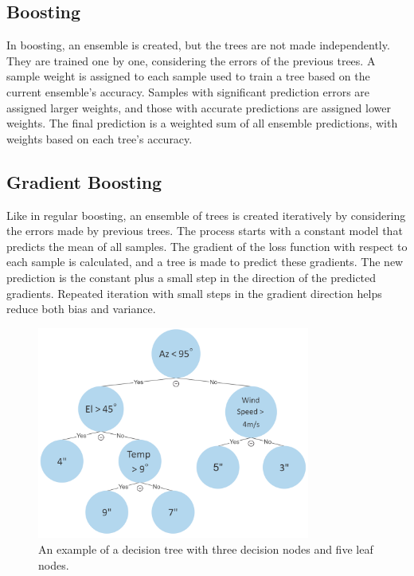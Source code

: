 \subsection{Boosting}
In boosting, an ensemble is created, but the trees are not made independently.
They are trained one by one, considering the errors of the previous trees.
A sample weight is assigned to each sample used to train a tree based on the current ensemble's accuracy.
Samples with significant prediction errors are assigned larger weights, and those with accurate predictions are assigned lower weights.
The final prediction is a weighted sum of all ensemble predictions, with weights based on each tree's accuracy.

\subsection{Gradient Boosting}
Like in regular boosting, an ensemble of trees is created iteratively by considering the errors made by previous trees.
The process starts with a constant model that predicts the mean of all samples.
The gradient of the loss function with respect to each sample is calculated, and a tree is made to predict these gradients.
The new prediction is the constant plus a small step in the direction of the predicted gradients.
Repeated iteration with small steps in the gradient direction helps reduce both bias and variance.




\begin{figure}[H]
    \centering
    \includegraphics[width=0.8\textwidth]{Other figures/decisiontree_example.PNG}
    \caption[Decision tree]{An example of a decision tree with three decision nodes and five leaf nodes.}
    \label{fig:decitiontree}
\end{figure}

